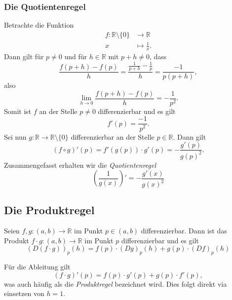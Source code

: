 \documentclass[../main.tex]{subfiles}
\begin{document}
\subsubsection*{Die Quotientenregel}
Betrachte die Funktion
\begin{align*}
  f \colon \mathbb{R} \setminus \{0\} & \to \mathbb{R} \\
  x & \mapsto \frac{1}{x}.
\end{align*}
Dann gilt für 
$p \neq 0$ und für $h \in \mathbb{R}$ mit $p + h \neq 0$, dass
\[
  \frac{f(p+h) - f(p)}{h} = \frac{\frac{1}{p+h} - \frac{1}{p}}{h}
  = \frac{-1}{p(p+h)},
\]
also
\[
  \lim_{h \to 0} \frac{f(p+h) - f(p)}{h} = - \frac{1}{p^2}.
\]
Somit ist $f$ an der Stelle
$p \neq 0$ differenzierbar und es gilt
\[
  f'(p) = \frac{-1}{p^2}.
\]
Sei nun $g \colon \mathbb{R} \to \mathbb{R} \setminus \{0\}$ 
differenzierbar an der Stelle $p \in \mathbb{R}$.
Dann gilt
\[
  (f \circ g)'(p) = f'(g(p)) \cdot g'(p)
  = -\frac{g'(p)}{{g(p)}^2}.
\]
Zusammengefasst erhalten wir die \emph{Quotientenregel}
\[
  \left( \frac{1}{g(x)} \right)' = -\frac{g'(x)}{{g(x)}^2}
\]

\subsection*{Die Produktregel}
\begin{productrule}
Seien $f, g \colon (a, b) \to \mathbb{R}$ 
im Punkt $p \in (a, b)$ differenzierbar.
Dann ist das Produkt
$f \cdot g \colon (a, b) \to \mathbb{R}$ 
im Punkt $p$ differenzierbar und es gilt
\[
  {(D(f \cdot g))}_p(h) = f(p) \cdot
  {(Dg)}_p(h) + g(p) \cdot {(Df)}_p(h)
\]
\end{productrule}

\begin{remark}
  Für die Ableitung gilt
  \[
    {(f\cdot g)}'(p) = f(p) \cdot g'(p) + g(p) \cdot f'(p),
  \]
  was auch häufig als die \emph{Produktregel}
  bezeichnet wird.
  Dies folgt direkt via einsetzen von $h = 1$.
\end{remark}
\end{document}
